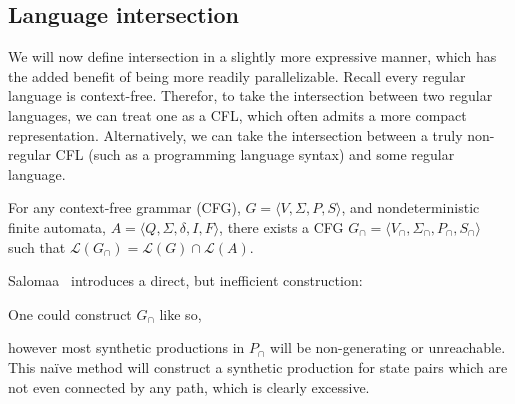 \documentclass[sigplan,review,acmsmall,nonacm,screen,anonymous]{acmart}\settopmatter{printfolios=false,printccs=false,printacmref=false}
\begin{document}
\subsection{Language intersection}

We will now define intersection in a slightly more expressive manner, which has the added benefit of being more readily parallelizable. Recall every regular language is context-free. Therefor, to take the intersection between two regular languages, we can treat one as a CFL, which often admits a more compact representation. Alternatively, we can take the intersection between a truly non-regular CFL (such as a programming language syntax) and some regular language.

\begin{theorem}
  For any context-free grammar (CFG), $G = \langle V, \Sigma, P, S\rangle$, and nondeterministic finite automata, $A = \langle Q, \Sigma, \delta, I, F\rangle$, there exists a CFG \(G_\cap=\langle V_\cap, \Sigma_\cap, P_\cap, S_\cap\rangle\) such that $\mathcal{L}(G_\cap) = \mathcal{L}(G)\cap\mathcal{L}(A)$.
\end{theorem}

Salomaa~\cite{salomaa1973formal} introduces a direct, but inefficient construction:

\begin{definition}[Salomaa, 1973]
  One could construct $G_\cap$ like so,

  \noindent{}
\end{definition}

\noindent however most synthetic productions in $P_\cap$ will be non-generating or unreachable. This na\"ive method will construct a synthetic production for state pairs which are not even connected by any path, which is clearly excessive. %
\end{document}

